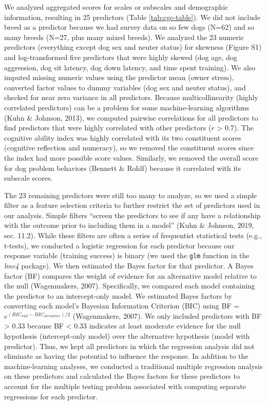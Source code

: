 \documentclass[
  english,
  ,pub,floatsintext]{apa6}
\begin{document}
We analyzed aggregated scores for scales or subscales and demographic information, resulting in 25 predictors (Table \ref{tab:cgc-table}). We did not include breed as a predictor because we had survey data on so few dogs (N=62) and so many breeds (N=27, plus many mixed breeds). We analyzed the 23 numeric predictors (everything except dog sex and neuter status) for skewness (Figure S1) and log-transformed five predictors that were highly skewed (dog age, dog aggression, dog sit latency, dog down latency, and time spent training). We also imputed missing numeric values using the predictor mean (owner stress), converted factor values to dummy variables (dog sex and neuter status), and checked for near zero variance in all predictors. Because multicollinearity (highly correlated predictors) can be a problem for some machine-learning algorithms (Kuhn \& Johnson, 2013), we computed pairwise correlations for all predictors to find predictors that were highly correlated with other predictors (\(r\) \textgreater{} 0.7). The cognitive ability index was highly correlated with its two constituent scores (cognitive reflection and numeracy), so we removed the constituent scores since the index had more possible score values. Similarly, we removed the overall score for dog problem behaviors (Bennett \& Rohlf) because it correlated with its subscale scores.

The 23 remaining predictors were still too many to analyze, so we used a simple filter as a feature selection criteria to further restrict the set of predictors used in our analysis. Simple filters ``screen the predictors to see if any have a relationship with the outcome prior to including them in a model'' (Kuhn \& Johnson, 2019, sec. 11.2). While these filters are often a series of frequentist statistical tests (e.g., t-tests), we conducted a logistic regression for each predictor because our response variable (training success) is binary (we used the \texttt{glm} function in the \emph{lme4} package). We then estimated the Bayes factor for that predictor. A Bayes factor (BF) compares the weight of evidence for an alternative model relative to the null (Wagenmakers, 2007). Specifically, we compared each model containing the predictor to an intercept-only model. We estimated Bayes factors by converting each model's Bayesian Information Criterion (BIC) using BF = \(e^{(BIC_{null}-BIC_{alernative}) / 2}\) (Wagenmakers, 2007). We only included predictors with BF \textgreater{} 0.33 because BF \textless{} 0.33 indicates at least moderate evidence for the null hypothesis (intercept-only model) over the alternative hypothesis (model with predictor). Thus, we kept all predictors in which the regression analysis did not eliminate as having the potential to influence the response. In addition to the machine-learning analyses, we conducted a traditional multiple regression analysis on these predictors and calculated the Bayes factors for these predictors to account for the multiple testing problem associated with computing separate regressions for each predictor.
\end{document}

